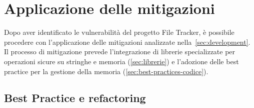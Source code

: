 \section{Applicazione delle mitigazioni}
\label{sec:mitigation_techniques}

Dopo aver identificato le vulnerabilità del progetto File Tracker, è possibile
procedere con l'applicazione delle mitigazioni analizzate nella~\autoref{sec:development}.
Il processo di mitigazione prevede l'integrazione di librerie specializzate per operazioni
sicure su stringhe e memoria (\autoref{sec:librerie}) e l'adozione delle best practice
per la gestione della memoria (\autoref{sec:best-practices-codice}).

\subsection*{Best Practice e refactoring}
